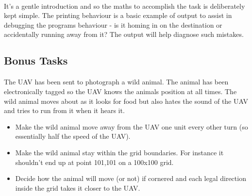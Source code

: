 \documentclass[11pt]{book}
\begin{document}
\paragraph{} It's a gentle introduction and so the maths to accomplish the task is deliberately kept simple. The printing behaviour is a basic example of output to assist in debugging the programs behaviour - is it homing in on the destination or accidentally running away from it? The output will help diagnose such mistakes.

\subsection{Bonus Tasks}

\paragraph{} The UAV has been sent to photograph a wild animal. The animal has been electronically tagged so the UAV knows the animals position at all times. The wild animal moves about as it looks for food but also hates the sound of the UAV and tries to run from it when it hears it.

\begin{itemize}
\item Make the wild animal move away from the UAV one unit every other turn (so essentially half the speed of the UAV).
\item Make the wild animal stay within the grid boundaries. For instance it shouldn't end up at point 101,101 on a 100x100 grid.
\item Decide how the animal will move (or not) if cornered and each legal direction inside the grid takes it closer to the UAV.
\end{itemize}

\clearpage
\end{document}
